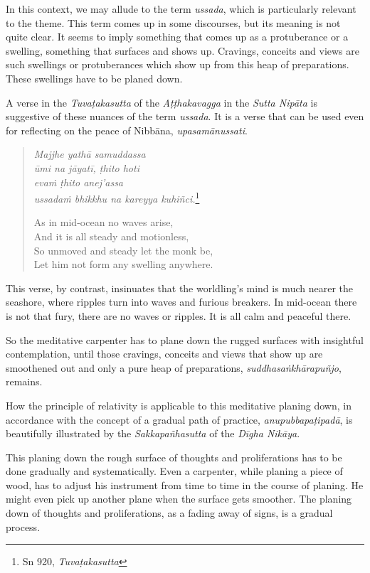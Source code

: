 In this context, we may allude to the term \emph{ussada}, which is particularly relevant to the theme. This term comes up in some discourses, but its meaning is not quite clear. It seems to imply something that comes up as a protuberance or a swelling, something that surfaces and shows up. Cravings, conceits and views are such swellings or protuberances which show up from this heap of preparations. These swellings have to be planed down.

A verse in the \emph{Tuvaṭakasutta} of the \emph{Aṭṭhakavagga} in the \emph{Sutta Nipāta} is suggestive of these nuances of the term \emph{ussada}. It is a verse that can be used even for reflecting on the peace of Nibbāna, \emph{upasamānussati}.

\begin{quote}
\emph{Majjhe yathā samuddassa}\\
\emph{ūmi na jāyatī, ṭhito hoti}\\
\emph{evaṁ ṭhito anej'assa}\\
\emph{ussadaṁ bhikkhu na kareyya kuhiñci.}\footnote{Sn 920, \emph{Tuvaṭakasutta}}

As in mid-ocean no waves arise,\\
And it is all steady and motionless,\\
So unmoved and steady let the monk be,\\
Let him not form any swelling anywhere.
\end{quote}

This verse, by contrast, insinuates that the worldling's mind is much nearer the seashore, where ripples turn into waves and furious breakers. In mid-ocean there is not that fury, there are no waves or ripples. It is all calm and peaceful there.

So the meditative carpenter has to plane down the rugged surfaces with insightful contemplation, until those cravings, conceits and views that show up are smoothened out and only a pure heap of preparations, \emph{suddhasaṅkhārapuñjo}, remains.

\enlargethispage{\baselineskip}

How the principle of relativity is applicable to this meditative planing down, in accordance with the concept of a gradual path of practice, \emph{anupubbapaṭipadā}, is beautifully illustrated by the \emph{Sakkapañhasutta} of the \emph{Dīgha Nikāya}.

This planing down the rough surface of thoughts and proliferations has to be done gradually and systematically. Even a carpenter, while planing a piece of wood, has to adjust his instrument from time to time in the course of planing. He might even pick up another plane when the surface gets smoother. The planing down of thoughts and proliferations, as a fading away of signs, is a gradual process.

